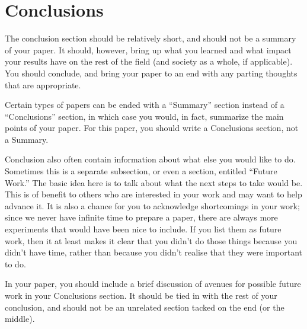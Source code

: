 \documentclass[12pt,letterpaper]{article}
\begin{document}
\section{Conclusions}
The conclusion section should be relatively short, and should not be a summary
of your paper.  It should, however, bring up what you learned and what impact
your results have on the rest of the field (and society as a
whole, if applicable).  You should conclude, and bring your paper to an  end
with any parting thoughts that are appropriate.

Certain types of papers can be ended with a ``Summary'' section instead of a
``Conclusions'' section, in which case you would, in fact, summarize the main
points of your paper.  For this paper, you should write a Conclusions section,
not a Summary.

Conclusion also often contain information about what else you would like
to do.  Sometimes this is a separate subsection, or even a section, entitled
``Future Work.''  The basic idea here is to talk about what the next steps to
take would be.  This is of benefit to others who are interested in your
work and may want to help advance it.  It is also a chance for you to
acknowledge shortcomings in your work; since we never have infinite time to
prepare a paper, there are always more experiments that would have been nice to
include.  If you list them as future work, then it at least makes it clear that
you didn't do those things because you didn't have time, rather than because you
didn't realise that they were important to do.

In your paper, you should include a brief discussion of avenues for possible
future work in your Conclusions section.  It should be tied in with the rest of
your conclusion, and should not be an unrelated section tacked on the end (or
the middle).



\end{document}
